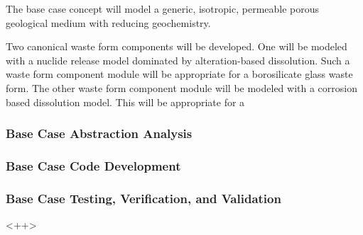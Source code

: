 

      The base case concept will model a generic, isotropic, permeable porous 
      geological medium with reducing geochemistry. 
  






      Two canonical waste form components will be developed. One will be modeled with 
      a nuclide release model dominated by alteration-based dissolution.  Such
      a waste form component module will be appropriate for a borosilicate glass waste form.  The 
      other waste form  component module will  be modeled with a corrosion based  
      dissolution model. This will be appropriate for a 




\subsubsection{Base Case Abstraction Analysis}


\subsubsection{Base Case Code Development}


\subsubsection{Base Case Testing, Verification, and Validation}<++>






